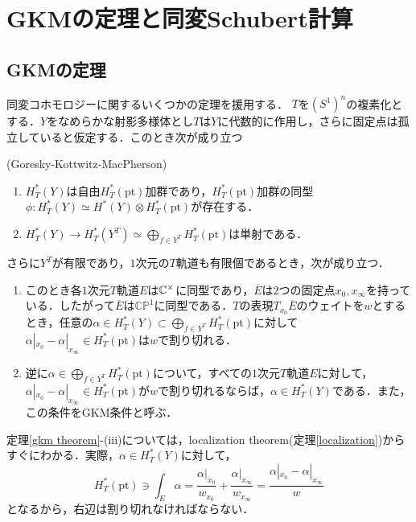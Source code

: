 \section{GKMの定理と同変Schubert計算}
\subsection{GKMの定理}
同変コホモロジーに関するいくつかの定理を援用する．
$T$を$(S^1)^n$の複素化とする．$Y$をなめらかな射影多様体とし$T$は$Y$に代数的に作用し，さらに固定点は孤立していると仮定する．このとき次が成り立つ

\begin{theo}(Goresky-Kottwitz-MacPherson\cite{GKM})\label{gkm theorem}
  \begin{enumerate}
    \item $H^*_T(Y)$は自由$H^*_T(\text{pt})$加群であり，$H^*_T(\text{pt})$加群の同型$\phi\colon H^*_T(Y)\simeq H^*(Y)\otimes H^*_T(\text{pt})$が存在する．
    
    \item $H^*_T(Y)\rightarrow H^*_T(Y^T) \simeq \bigoplus_{f\in Y^T}H^*_T(\text{pt})$は単射である．
  \end{enumerate}
  さらに$Y^T$が有限であり，$1$次元の$T$軌道も有限個であるとき，次が成り立つ．
  \begin{enumerate}
    \item このとき各$1$次元$T$軌道$E$は$\mathbb{C}^\times$に同型であり，$\overline{E}$は$2$つの固定点$x_0,x_\infty$を持っている．したがって$\overline{E}$は$\mathbb{CP}^1$に同型である．$T$の表現$T_{x_0}\overline{E}$のウェイトを$w$とするとき，任意の$\alpha\in H^*_T(Y)\subset \bigoplus_{f\in Y^T}H^*_T(\text{pt})$に対して
    $\alpha|_{x_0} - \alpha|_{x_\infty}\in H^*_T(\text{pt})$は$w$で割り切れる．
  
    \item 逆に$\alpha\in \bigoplus_{f\in Y^T}H^*_T(\text{pt})$について，すべての$1$次元$T$軌道$E$に対して，$\alpha|_{x_0} - \alpha|_{x_\infty}\in H^*_T(\text{pt})$が$w$で割り切れるならば，$\alpha\in H^*_T(Y)$である．また，この条件をGKM条件と呼ぶ．
  \end{enumerate}
\end{theo}

定理\ref{gkm theorem}-(iii)については，localization theorem(定理\ref{localization})からすぐにわかる．実際，$\alpha\in H^*_T(Y)$に対して，
\[
H^*_T(\text{pt})\owns\int_E\alpha = \frac{\alpha|_{x_0}}{w_{x_0}} + \frac{\alpha|_{x_\infty}}{w_{x_\infty}} = \frac{\alpha|_{x_0}-\alpha|_{x_\infty}}{w}
\]
となるから，右辺は割り切れなければならない．


